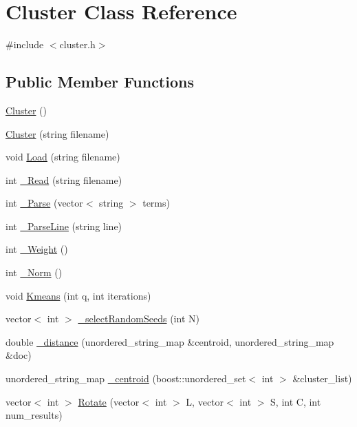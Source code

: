 \hypertarget{classCluster}{
\section{Cluster Class Reference}
\label{classCluster}
}


{\ttfamily \#include $<$cluster.h$>$}

\subsection*{Public Member Functions}
\begin{DoxyCompactItemize}
\item 
\hyperlink{classCluster_aee7feb1d599d4c8fda6c3ee83e86ba81}{Cluster} ()
\item 
\hyperlink{classCluster_a5de4b997d842d70481a2f5d6a95a9028}{Cluster} (string filename)
\item 
void \hyperlink{classCluster_a5ed14940e783acc2e3165a1631f8227d}{Load} (string filename)
\item 
int \hyperlink{classCluster_a304851e372265d7437cbb394cbdc9019}{\_\-Read} (string filename)
\item 
int \hyperlink{classCluster_aae67862083dc7fd4da97cfbf1dd7f97f}{\_\-Parse} (vector$<$ string $>$ terms)
\item 
int \hyperlink{classCluster_a79563a9a84e7743db09496e8527001c1}{\_\-ParseLine} (string line)
\item 
int \hyperlink{classCluster_aac2c14c8110c96fac48a8d573632d2e3}{\_\-Weight} ()
\item 
int \hyperlink{classCluster_ae5be7facdae33195b618e2c8941b011f}{\_\-Norm} ()
\item 
void \hyperlink{classCluster_aed7e02360882a7bf0e710bdaacf92972}{Kmeans} (int q, int iterations)
\item 
vector$<$ int $>$ \hyperlink{classCluster_a965381fcbc3fd3de1bd7fac5dbce18a8}{\_\-selectRandomSeeds} (int N)
\item 
double \hyperlink{classCluster_a969670efa1f56b84038da737ad585e62}{\_\-distance} (unordered\_\-string\_\-map \&centroid, unordered\_\-string\_\-map \&doc)
\item 
unordered\_\-string\_\-map \hyperlink{classCluster_a95315207d37fd73cdfffca386b78d38f}{\_\-centroid} (boost::unordered\_\-set$<$ int $>$ \&cluster\_\-list)
\item 
vector$<$ int $>$ \hyperlink{classCluster_ac3f0b7d4f0bf313c9c23df90728a5106}{Rotate} (vector$<$ int $>$ L, vector$<$ int $>$ S, int C, int num\_\-results)

\end{DoxyCompactItemize}
